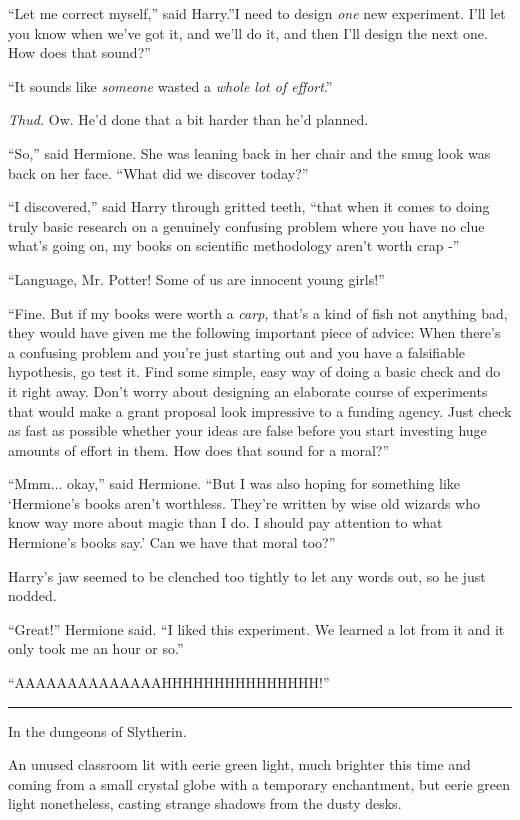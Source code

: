 ``Let me correct myself,'' said Harry.''I need to design \emph{one} new
experiment. I'll let you know when we've got it, and we'll do it, and
then I'll design the next one. How does that sound?''

``It sounds like \emph{someone} wasted a \emph{whole lot of effort}.''

\emph{Thud.} Ow. He'd done that a bit harder than he'd planned.

``So,'' said Hermione. She was leaning back in her chair and the smug
look was back on her face. ``What did we discover today?''

``I discovered,'' said Harry through gritted teeth, ``that when it comes
to doing truly basic research on a genuinely confusing problem where you
have no clue what's going on, my books on scientific methodology aren't
worth crap -''

``Language, Mr. Potter! Some of us are innocent young girls!''

``Fine. But if my books were worth a \emph{carp,} that's a kind of fish
not anything bad, they would have given me the following important piece
of advice: When there's a confusing problem and you're just starting out
and you have a falsifiable hypothesis, go test it. Find some simple,
easy way of doing a basic check and do it right away. Don't worry about
designing an elaborate course of experiments that would make a grant
proposal look impressive to a funding agency. Just check as fast as
possible whether your ideas are false before you start investing huge
amounts of effort in them. How does that sound for a moral?''

``Mmm... okay,'' said Hermione. ``But I was also hoping for
something like `Hermione's books aren't worthless. They're written by
wise old wizards who know way more about magic than I do. I should pay
attention to what Hermione's books say.' Can we have that moral too?''

Harry's jaw seemed to be clenched too tightly to let any words out, so
he just nodded.

``Great!'' Hermione said. ``I liked this experiment. We learned a lot
from it and it only took me an hour or so.''

``AAAAAAAAAAAAAAHHHHHHHHHHHHHHH!''

\begin{center}\rule{3in}{0.4pt}\end{center}

In the dungeons of Slytherin.

An unused classroom lit with eerie green light, much brighter this time
and coming from a small crystal globe with a temporary enchantment, but
eerie green light nonetheless, casting strange shadows from the dusty
desks.

